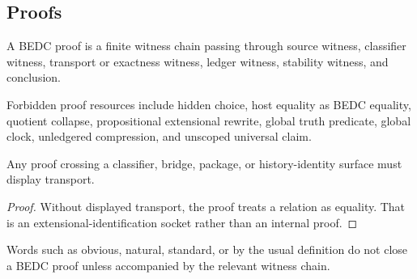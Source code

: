 \subsection{Proofs}
\label{subsec:philosophy-proof-discipline}

\begin{definition}
\label{def:philosophy-bedc-proof-discipline}
A BEDC proof is a finite witness chain passing through source witness,
classifier witness, transport or exactness witness, ledger witness,
stability witness, and conclusion.
\end{definition}

\begin{definition}
\label{def:philosophy-forbidden-proof-resources}
Forbidden proof resources include hidden choice, host equality as BEDC
equality, quotient collapse, propositional extensional rewrite, global
truth predicate, global clock, unledgered compression, and unscoped
universal claim.
\end{definition}

\begin{theorem}
\label{thm:philosophy-proofs-display-transport}
Any proof crossing a classifier, bridge, package, or history-identity
surface must display transport.
\end{theorem}
\begin{proof}
Without displayed transport, the proof treats a relation as equality.
That is an extensional-identification socket rather than an internal
proof.
\end{proof}

\begin{corollary}
\label{cor:philosophy-obviousness-not-witness}
Words such as obvious, natural, standard, or by the usual definition do
not close a BEDC proof unless accompanied by the relevant witness
chain.
\end{corollary}
